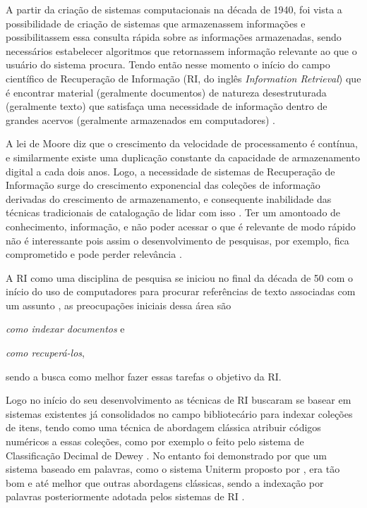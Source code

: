 
A partir da criação de sistemas computacionais na década de 1940, foi vista a possibilidade de criação de sistemas que armazenassem informações e possibilitassem essa consulta rápida sobre as informações armazenadas, sendo necessários estabelecer algoritmos que retornassem informação relevante ao que o usuário do sistema procura. 
Tendo então nesse momento o início do campo científico de Recuperação de Informação (RI, do inglês \textit{Information Retrieval}) que é encontrar material (geralmente documentos) de natureza desestruturada (geralmente texto) que satisfaça uma necessidade de informação dentro de grandes acervos (geralmente armazenados em computadores) \cite[p.~1]{Manning2008IIR}.

A lei de Moore diz que o crescimento da velocidade de processamento é contínua, e similarmente existe uma duplicação constante da capacidade de armazenamento digital a cada dois anos. %
Logo, a necessidade de sistemas de Recuperação de Informação surge do crescimento exponencial das coleções de informação derivadas do crescimento de armazenamento, e consequente inabilidade das técnicas tradicionais de catalogação de lidar com isso \cite{Sanderson2012THIRR}.
Ter um amontoado de conhecimento, informação, e não poder acessar o que é relevante de modo rápido não é interessante pois assim o desenvolvimento de pesquisas, por exemplo, fica comprometido e pode perder relevância \cite{Bush:1979:WMT:1113634.1113638}.

A RI como uma disciplina de pesquisa se iniciou no final da década de 50 com o início do uso de computadores para procurar referências de texto associadas com um assunto \cite[p.~3]{Sanderson2012THIRR}, as preocupações iniciais dessa área são 
\begin{enumerate*}[label=(\alph*)]
\item \textit{como indexar documentos} e \item \textit{como recuperá-los},
\end{enumerate*}
sendo a busca como melhor fazer essas tarefas o objetivo da RI.

Logo no início do seu desenvolvimento as técnicas de RI buscaram se basear em sistemas existentes já consolidados no campo bibliotecário para indexar coleções de itens, tendo como uma técnica de abordagem clássica atribuir códigos numéricos a essas coleções, como por exemplo o feito pelo sistema de Classificação Decimal de Dewey \cite[p.~1446]{Sanderson2012THIRR}.
No entanto foi demonstrado por  que um sistema baseado em palavras, como o sistema Uniterm proposto por , era tão bom e até melhor que outras abordagens clássicas, sendo a indexação por palavras posteriormente adotada pelos sistemas de RI \cite[p.~1446]{Sanderson2012THIRR}.

